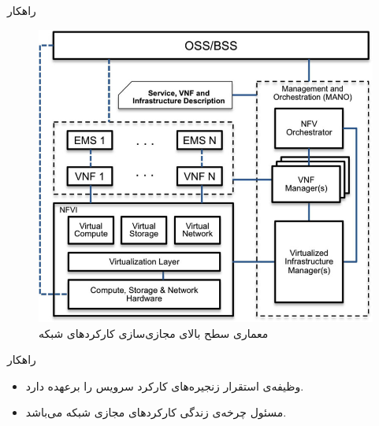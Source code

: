 \documentclass[dvipsnames]{beamer}
\makeatletter
\newcommand{\RTList}{\raggedleft\rightskip\@totalleftmargin}
\makeatother
\begin{document}
\begin{persian}
	\begin{frame}{راهکار }
		\begin{center}\begin{figure}
				\includegraphics[scale=0.5]{images/nfv-arch.png}
				\caption{معماری سطح بالای مجازی‌سازی کارکردهای شبکه}
			\end{figure}\end{center}
	\end{frame}

	\begin{frame}{راهکار }
		\begin{itemize}\RTList{}
			\justifying
			\item {} وظیفه‌ی استقرار زنجیره‌های کارکرد سرویس را برعهده دارد.
			\item {} مسئول چرخه‌ی زندگی کارکردهای مجازی شبکه می‌باشد.
		\end{itemize}
	\end{frame}


\end{persian}
\end{document}
